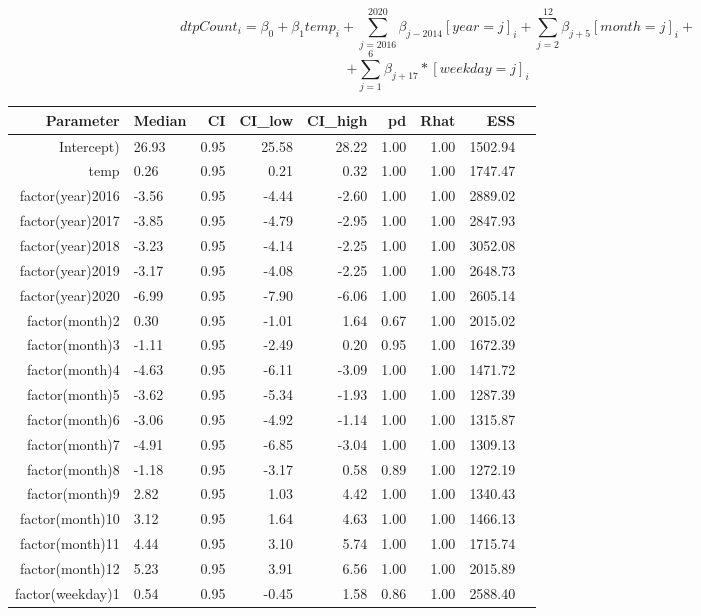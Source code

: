 \documentclass[a4paper, 14pt]{article}
\begin{document}
\[
	dtpCount_i = \beta_0 + \beta_1 temp_i + \sum_{j=2016}^{2020} \beta_{j - 2014}[year = j]_i + \sum_{j = 2}^{12} \beta_{j + 5} [month = j]_i +
\]
\[
	+ \sum_{j=1}^{6} \beta_{j + 17} * [weekday = j]_i
\]

\begin{table}[ht]
	\centering
	\begin{tabular}{rlrrrrrrr}
		\hline
		Parameter & Median & CI & CI\_low & CI\_high & pd & Rhat & ESS \\ 
		\hline
		Intercept) & 26.93 & 0.95 & 25.58 & 28.22 & 1.00 & 1.00 & 1502.94 \\ 
		temp & 0.26 & 0.95 & 0.21 & 0.32 & 1.00 & 1.00 & 1747.47 \\ 
		factor(year)2016 & -3.56 & 0.95 & -4.44 & -2.60 & 1.00 & 1.00 & 2889.02 \\ 
		factor(year)2017 & -3.85 & 0.95 & -4.79 & -2.95 & 1.00 & 1.00 & 2847.93 \\ 
		factor(year)2018 & -3.23 & 0.95 & -4.14 & -2.25 & 1.00 & 1.00 & 3052.08 \\ 
		factor(year)2019 & -3.17 & 0.95 & -4.08 & -2.25 & 1.00 & 1.00 & 2648.73 \\ 
		factor(year)2020 & -6.99 & 0.95 & -7.90 & -6.06 & 1.00 & 1.00 & 2605.14 \\ 
		factor(month)2 & 0.30 & 0.95 & -1.01 & 1.64 & 0.67 & 1.00 & 2015.02 \\ 
		factor(month)3 & -1.11 & 0.95 & -2.49 & 0.20 & 0.95 & 1.00 & 1672.39 \\ 
		factor(month)4 & -4.63 & 0.95 & -6.11 & -3.09 & 1.00 & 1.00 & 1471.72 \\ 
		factor(month)5 & -3.62 & 0.95 & -5.34 & -1.93 & 1.00 & 1.00 & 1287.39 \\ 
		factor(month)6 & -3.06 & 0.95 & -4.92 & -1.14 & 1.00 & 1.00 & 1315.87 \\ 
		factor(month)7 & -4.91 & 0.95 & -6.85 & -3.04 & 1.00 & 1.00 & 1309.13 \\ 
		factor(month)8 & -1.18 & 0.95 & -3.17 & 0.58 & 0.89 & 1.00 & 1272.19 \\ 
		factor(month)9 & 2.82 & 0.95 & 1.03 & 4.42 & 1.00 & 1.00 & 1340.43 \\ 
		factor(month)10 & 3.12 & 0.95 & 1.64 & 4.63 & 1.00 & 1.00 & 1466.13 \\ 
		factor(month)11 & 4.44 & 0.95 & 3.10 & 5.74 & 1.00 & 1.00 & 1715.74 \\ 
		factor(month)12 & 5.23 & 0.95 & 3.91 & 6.56 & 1.00 & 1.00 & 2015.89 \\ 
		factor(weekday)1 & 0.54 & 0.95 & -0.45 & 1.58 & 0.86 & 1.00 & 2588.40 \\ 

\end{tabular}
\end{table}
\end{document}
